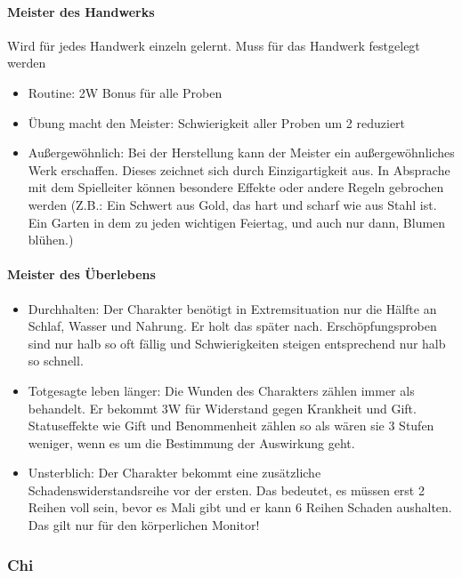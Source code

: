 \documentclass{article}
\begin{document}
\paragraph{Meister des Handwerks}

Wird für jedes Handwerk einzeln gelernt. Muss für das Handwerk festgelegt werden

\begin{itemize}
\item Routine: 2W Bonus für alle Proben
\item Übung macht den Meister: Schwierigkeit aller Proben um 2 reduziert
\item Außergewöhnlich: Bei der Herstellung kann der Meister ein außergewöhnliches Werk erschaffen. Dieses zeichnet sich durch Einzigartigkeit aus. In Absprache mit dem Spielleiter können besondere Effekte oder andere Regeln gebrochen werden (Z.B.: Ein Schwert aus Gold, das hart und scharf wie aus Stahl ist. Ein Garten in dem zu jeden wichtigen Feiertag, und auch nur dann, Blumen blühen.)
\end{itemize}

\paragraph{Meister des Überlebens}

\begin{itemize}
\item Durchhalten: Der Charakter benötigt in Extremsituation nur die Hälfte an Schlaf, Wasser und Nahrung. Er holt das später nach. Erschöpfungsproben sind nur halb so oft fällig und Schwierigkeiten steigen entsprechend nur halb so schnell.
\item Totgesagte leben länger: Die Wunden des Charakters zählen immer als behandelt. Er bekommt 3W für Widerstand gegen Krankheit und Gift. Statuseffekte wie Gift und Benommenheit zählen so als wären sie 3 Stufen weniger, wenn es um die Bestimmung der Auswirkung geht.
\item Unsterblich: Der Charakter bekommt eine zusätzliche Schadenswiderstandsreihe vor der ersten. Das bedeutet, es müssen erst 2 Reihen voll sein, bevor es Mali gibt und er kann 6 Reihen Schaden aushalten. Das gilt nur für den  körperlichen Monitor!
\end{itemize}

\subsubsection{Chi}
\end{document}
